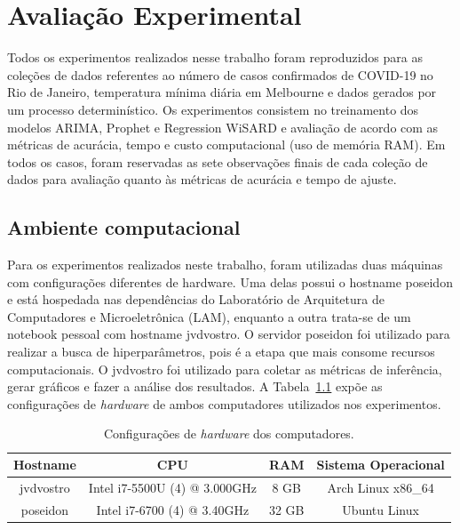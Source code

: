 \chapter{Avaliação Experimental}\label{chap:05}

Todos os experimentos realizados nesse trabalho foram reproduzidos para as coleções de dados referentes ao número de casos confirmados de COVID-19 no Rio de Janeiro, temperatura mínima diária em Melbourne e dados gerados por um processo determinístico. Os experimentos consistem no treinamento dos modelos ARIMA, Prophet e Regression WiSARD e avaliação de acordo com as métricas de acurácia, tempo e custo computacional (uso de memória RAM). Em todos os casos, foram reservadas as sete observações finais de cada coleção de dados para avaliação quanto às métricas de acurácia e tempo de ajuste.

\section{Ambiente computacional}
Para os experimentos realizados neste trabalho, foram utilizadas duas máquinas com configurações diferentes de hardware. Uma delas possui o hostname poseidon e está hospedada nas dependências do Laboratório de Arquitetura de Computadores e Microeletrônica (LAM), enquanto a outra trata-se de um notebook pessoal com hostname jvdvostro. O servidor poseidon foi utilizado para realizar a busca de hiperparâmetros, pois é a etapa que mais consome recursos computacionais. O jvdvostro foi utilizado para coletar as métricas de inferência, gerar gráficos e fazer a análise dos resultados. A Tabela~\ref{tab:hardware} expõe as configurações de \textit{hardware} de ambos computadores utilizados nos experimentos.

\begin{table}[!htp]
    \caption{Configurações de \textit{hardware} dos computadores.}\label{tab:hardware}
    \centering
    \begin{tabular}{@{}cccc@{}}\toprule
        Hostname  & CPU                           & RAM   & Sistema Operacional \\ \midrule
        jvdvostro & Intel i7-5500U (4) @ 3.000GHz & 8 GB  & Arch Linux x86\_64  \\
        poseidon  & Intel i7-6700 (4) @ 3.40GHz   & 32 GB & Ubuntu Linux        \\ \bottomrule
    \end{tabular}
\end{table}

